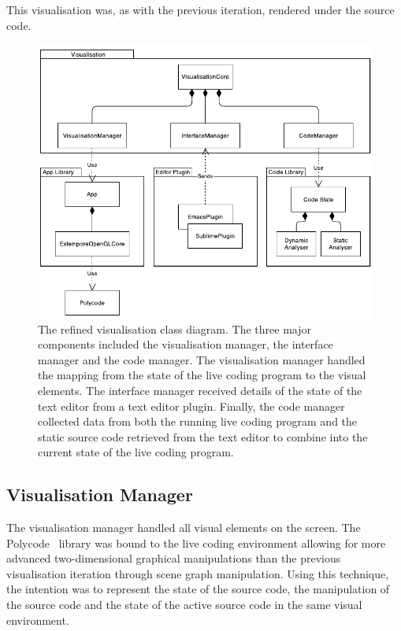 This visualisation was, as with the previous iteration, rendered under the source code. \more


\begin{figure}
  \centering \includegraphics[width=\columnwidth]{../images/diagrams/visualisation-class-diagram.pdf}
  \caption[The refined visualisation class diagram]{The refined visualisation class diagram. The three major components included the visualisation manager, the interface manager and the code manager. The visualisation manager handled the mapping from the state of the live coding program to the visual elements. The interface manager received details of the state of the text editor from a text editor plugin. Finally, the code manager collected data from both the running live coding program and the static source code retrieved from the text editor to combine into the current state of the live coding program.}
\label{fig:visualisation-class-diagram}
\end{figure}

\subsection{Visualisation Manager}

The visualisation manager handled all visual elements on the screen. The Polycode~\cite{Safrin2013} library was bound to the live coding environment allowing for more advanced two-dimensional graphical manipulations than the previous visualisation iteration through scene graph manipulation. Using this technique, the intention was to represent the state of the source code, the manipulation of the source code and the state of the active source code in the same visual environment.

